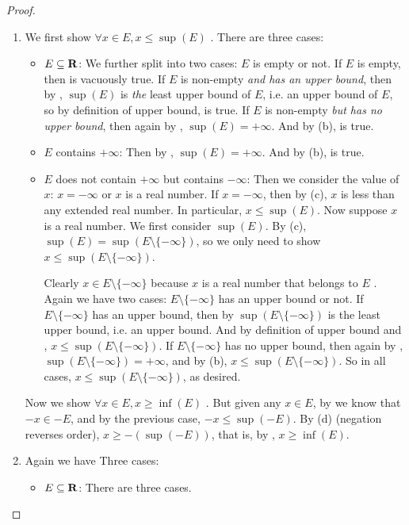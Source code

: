 \begin{proof}
\begin{enumerate}
\item
    We first show \(\forall x \in E, x \le \sup(E)\) .
    There are three cases:
    \begin{itemize}
    \item \(E \subseteq \mathbf{R}\):
        We further split into two cases: \(E\) is empty or not.
        If \(E\) is empty, then  is vacuously true.
        If \(E\) is non-empty \emph{and has an upper bound}, then by , \(\sup(E)\) is \emph{the} least upper bound of \(E\), i.e. an upper bound of \(E\), so by definition of upper bound,  is true.
        If \(E\) is non-empty \emph{but has no upper bound}, then again by , \(\sup(E) = +\infty\). And by (b),  is true.
    \item \(E\) contains \(+\infty\):
        Then by , \(\sup(E) = +\infty\).
        And by (b),  is true.
    \item \(E\) does not contain \(+\infty\) but contains \(-\infty\):
        Then we consider the value of \(x\): \(x = -\infty\) or \(x\) is a real number.
        If \(x = -\infty\), then by (c), \(x\) is less than any extended real number.
        In particular, \(x \le \sup(E)\).
        Now suppose \(x\) is a real number.
        We first consider \(\sup(E)\).
        By (c), \(\sup(E) = \sup(E \setminus \{-\infty\})\), so we only need to show \(x \le \sup(E \setminus \{-\infty\})\).

        Clearly \(x \in E \setminus \{-\infty\}\) because \(x\) is a real number that belongs to \(E\) .
        Again we have two cases: \(E \setminus \{-\infty\}\) has an upper bound or not.
        If \(E \setminus \{-\infty\}\) has an upper bound, then by  \(\sup(E \setminus \{-\infty\})\) is the least upper bound, i.e. an upper bound.
        And by definition of upper bound and , \(x \le \sup(E \setminus \{-\infty\})\).
        If \(E \setminus \{-\infty\}\) has no upper bound, then again by , \(\sup(E \setminus \{-\infty\}) = +\infty\), and by (b), \(x \le \sup(E \setminus \{-\infty\})\).
        So in all cases, \(x \le \sup(E \setminus \{-\infty\})\), as desired.
    \end{itemize}
    Now we show \(\forall x \in E, x \ge \inf(E)\) .
    But given any \(x \in E\), by  we know that \(-x \in -E\), and by the previous case, \(-x \le \sup(-E)\).
    By (d) (negation reverses order), \(x \ge -(\sup(-E))\), that is, by , \(x \ge \inf(E)\).
\item
    Again we have Three cases:
    \begin{itemize}
    \item \(E \subseteq \mathbf{R}\):
        There are three cases.


\end{itemize}
\end{enumerate}
\end{proof}
